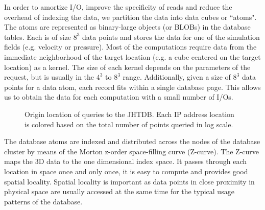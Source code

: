\documentclass[10pt,twocolumn]{article}
\begin{document}
In order to amortize I/O, improve the specificity of reads and reduce the overhead of indexing the data, we partition the data into data cubes or ``atoms".
The atoms are represented as binary-large objects (or BLOBs) in the database tables. Each is of size $8^3$ data points and stores the data for one of the
simulation fields (e.g. velocity or pressure). Most of the computations require data from the immediate neighborhood of the target location (e.g. a cube
centered on the target location) as a kernel. The size of each kernel depends on the parameters of the request, but is usually in the $4^3$ to $8^3$ range.
Additionally, given a size of $8^3$ data points for a data atom, each record fits within a single database page. This allows us to obtain the data for each
computation with a small number of I/Os.

\begin{figure}
\caption{Origin location of queries to the JHTDB. Each IP address location is colored based on the total number of points queried in log scale.}
\label{fig:ip_map}
\end{figure}

The database atoms are indexed and distributed across the nodes of the database cluster by means of the Morton z-order space-filling curve (Z-curve). The 
Z-curve maps the 3D data to the one dimensional index space. It passes through each location in space once and only once, it is easy to compute and
provides good spatial locality. Spatial locality is important as data points in close proximity in physical space are usually accessed at the same time for the
typical usage patterns of the database.
\end{document}
